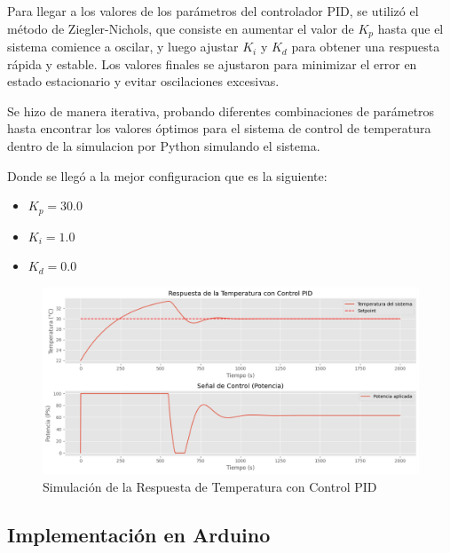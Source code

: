 \documentclass[spanish, a4paper, 11pt]{article}
\begin{document}
Para llegar a los valores de los parámetros del controlador PID, se utilizó el método de Ziegler-Nichols, que consiste en aumentar el valor de \(K_p\) hasta que el sistema comience a oscilar, y luego ajustar \(K_i\) y \(K_d\) para obtener una respuesta rápida y estable. Los valores finales se ajustaron para minimizar el error en estado estacionario y evitar oscilaciones excesivas.

Se hizo de manera iterativa, probando diferentes combinaciones de parámetros hasta encontrar los valores óptimos para el sistema de control de temperatura dentro de la simulacion por Python simulando el sistema.

Donde se llegó a la mejor configuracion que es la siguiente:

\begin{itemize}
    \item \(K_p = 30.0\)
    \item \(K_i = 1.0\)
    \item \(K_d = 0.0\)
\end{itemize}

\begin{figure}[ht]
    \centering
    \includegraphics[width=1\textwidth]{Simulacion_PID.png}
    \caption{Simulación de la Respuesta de Temperatura con Control PID}
\end{figure}
\FloatBarrier

\subsection{Implementación en Arduino}
\end{document}
